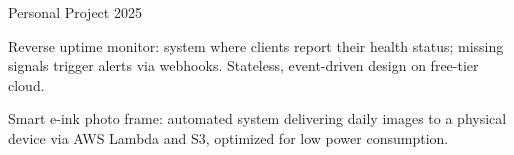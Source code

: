 
\begin{cventries}

  \cventry
    {Personal Project} %
    {} %
    {} %
    {2025} %
    {
      \begin{cvitems}
        \item {Reverse uptime monitor: system where clients report their health status; missing signals trigger alerts via webhooks. Stateless, event-driven design on free-tier cloud.}
        \item {Smart e-ink photo frame: automated system delivering daily images to a physical device via AWS Lambda and S3, optimized for low power consumption.}
      \end{cvitems}
    }

\end{cventries}
